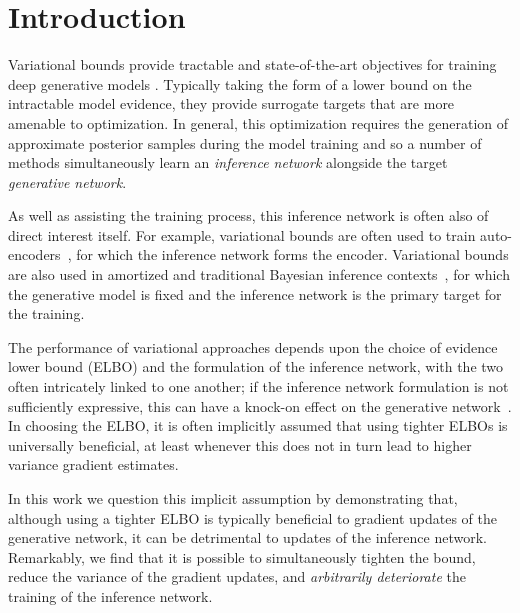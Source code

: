 
\section{Introduction}
\label{sec:intro}
Variational bounds provide tractable and state-of-the-art objectives for training deep generative models \citep{kingma2014auto,rezende2014stochastic}.  Typically taking
the form of a lower bound on the intractable model evidence, 
they provide surrogate targets that are more amenable to optimization.
In general, this optimization
requires the generation of approximate posterior samples during the model
training and so a number of methods simultaneously learn an \emph{inference
network} alongside the target \emph{generative network}. 

As well as assisting the training process, this inference network is often also of
direct interest itself.  For example, variational bounds are often used to train 
auto-encoders~\citep{bourlard1988auto,hinton1994autoencoders,gregor2016towards,chen2016variational},
for which the inference network forms the encoder.
Variational bounds are also used in amortized and traditional Bayesian inference 
 contexts~\cite{hoffman2013stochastic,ranganath2014black,
 	paige2016inference,le2017inference}, for which the generative model
 is fixed and the inference network is the primary target for the training.

The performance of variational approaches depends upon the choice of
evidence lower bound (\gls{ELBO})
and the formulation of the inference network, with the two often intricately linked to one another;
if the inference network formulation is not sufficiently expressive, this can have 
a knock-on effect on the generative network~\citep{burda2016importance}.  
In choosing the \gls{ELBO}, it is often implicitly
assumed that using tighter \glspl{ELBO} is universally beneficial,
at least whenever this does not in turn lead to higher variance 
gradient estimates.


In this work we question this implicit assumption
by demonstrating that,
although using a tighter \gls{ELBO} is typically beneficial to gradient 
updates of the 
generative network, it can be detrimental to updates of
 the inference network.
Remarkably, we find that it is possible to simultaneously tighten the bound,
reduce the variance of the gradient updates, and \emph{arbitrarily deteriorate} the
training of the inference network.

